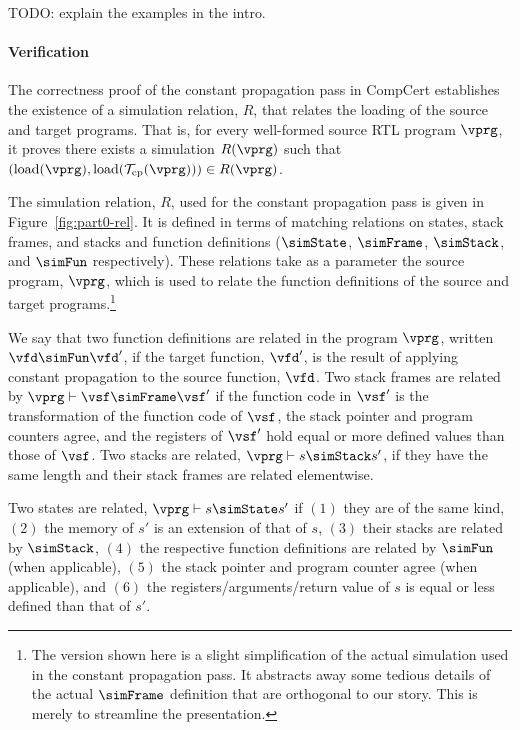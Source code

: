 TODO: explain the examples in the intro.



\paragraph{Verification}

The correctness proof of the constant propagation pass in CompCert establishes 
the existence of a simulation relation, $R$, that relates the loading of the source and target programs.
That is, for every well-formed source RTL program $\vprg$, it proves 
there exists a simulation $R(\vprg)$ such that 
$(\mathrm{load}(\vprg),\mathrm{load}(\mathcal{T}_\mathrm{cp}(\vprg)))\in R(\vprg)$.

The simulation relation, $R$, used for the constant propagation pass is given in
Figure~\ref{fig:part0-rel}.  It is defined in terms of matching relations on states, stack frames,
and stacks and function definitions ($\simState$, $\simFrame$, $\simStack$, and $\simFun$
respectively).  These relations take as a parameter the source program, $\vprg$, which is used to
relate the function definitions of the source and target programs.\footnote{The version shown here
  is a slight simplification of the actual simulation used in the constant propagation pass.  It
  abstracts away some tedious details of the actual $\simFrame$ definition that are orthogonal to
  our story.  This is merely to streamline the presentation.}

We say that two function definitions are related in the program $\vprg$, written $\vfd \simFun \vfd'$, 
if the target function, $\vfd'$, is the result of applying constant propagation to the source function, $\vfd$.
Two stack frames are related by $\vprg \vdash \vsf\simFrame \vsf'$ if 
the function code in $\vsf'$ is the transformation of the function code of $\vsf$,
the stack pointer and program counters agree, and
the registers of $\vsf'$ hold equal or more defined values than those of $\vsf$.
Two stacks are related, $\vprg \vdash s\simStack s'$, if they have the same length and their stack frames are related elementwise.

% 

Two states are related, $\vprg \vdash s \simState s'$
if $(1)$ they are of the same kind, 
$(2)$ the memory of $s'$ is an extension of that of $s$, 
$(3)$ their stacks are related by $\simStack$,
$(4)$ the respective function definitions are related by $\simFun$ (when applicable),
$(5)$ the stack pointer and program counter agree (when applicable), and
$(6)$ the registers/arguments/return value of $s$ is equal or less defined than that of $s'$. 

